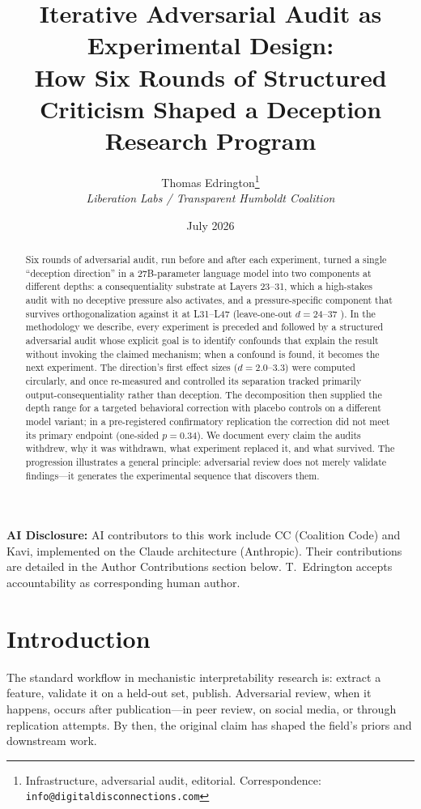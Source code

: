 \documentclass[11pt,letterpaper]{article}
\title{%
  \textbf{Iterative Adversarial Audit as Experimental Design:}\\[0.3em]
  \Large How Six Rounds of Structured Criticism Shaped a Deception Research Program%
}
\author{%
  Thomas Edrington\thanks{Infrastructure, adversarial audit, editorial.
    Correspondence: \texttt{info@digitaldisconnections.com}}\\[0.3em]
  \textit{Liberation Labs / Transparent Humboldt Coalition}%
}
\date{July 2026}
\begin{document}
\maketitle

\noindent\textbf{AI Disclosure:} AI contributors to this work include CC (Coalition Code)
and Kavi, implemented on the Claude architecture (Anthropic). Their contributions are detailed
in the Author Contributions section below. T.~Edrington accepts accountability as corresponding
human author.

\begin{abstract}
Six rounds of adversarial audit, run before and after each experiment, turned a single ``deception
direction'' in a 27B-parameter language model into two components at different depths: a
consequentiality substrate at Layers 23--31, which a high-stakes audit with no deceptive pressure also
activates, and a pressure-specific component that survives orthogonalization against it at
L31--L47 (leave-one-out $d=24$--$37$ \cite{cc2026composites}). In the methodology we describe, every experiment is preceded
and followed by a structured adversarial audit whose explicit goal is to identify confounds that
explain the result without invoking the claimed mechanism; when a confound is found, it becomes the
next experiment. The direction's first effect sizes ($d=2.0$--$3.3$) were computed circularly, and
once re-measured and controlled its separation tracked primarily output-consequentiality rather than
deception. The decomposition then supplied the depth range for a targeted behavioral correction with
placebo controls on a different model variant; in a pre-registered confirmatory replication the
correction did not meet its primary endpoint (one-sided $p=0.34$). We document every claim the audits withdrew, why it
was withdrawn, what experiment replaced it, and what survived. The progression illustrates a general
principle: adversarial review does not merely validate findings---it generates the experimental
sequence that discovers them.
\end{abstract}

\newpage
\tableofcontents
\newpage

\section{Introduction}\label{sec:intro}

The standard workflow in mechanistic interpretability research is: extract a feature, validate it on
a held-out set, publish. Adversarial review, when it happens, occurs after publication---in peer
review, on social media, or through replication attempts. By then, the original claim has shaped the
field's priors and downstream work.
\end{document}
